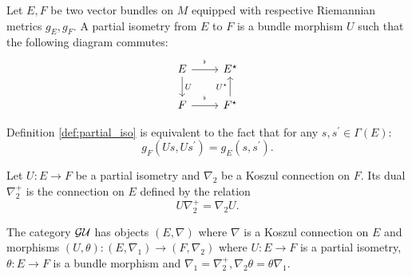\begin{defn}
\label{def:partial_iso}
Let $E,F$ be two vector bundles on $M$ equipped with respective Riemannian metrics $g_E,g_F.$ A partial isometry from $E$ to $F$ is a bundle morphism $U$ such that the following diagram commutes:
\begin{equation}
    \label{eq:partial_iso}
    \begin{tikzcd}
        E \ar[r,"{}^\flat"] \ar[d,"U"] & E^\star \\
        F \ar[r,"{}^\flat"] & F^\star \ar[u,"U^\star"]
    \end{tikzcd}
\end{equation}
\end{defn}
\begin{rem}
    Definition \ref{def:partial_iso} is equivalent to the fact that for any $s,s^\prime \in \Gamma(E)$:
    \[
    g_F\left(Us, Us^\prime\right) = g_E\left(s,s^\prime\right).
    \]
\end{rem}
\begin{defn}
\label{def:general_dual_connections}
Let $U \colon E \to F$ be a partial isometry and $\nabla_2$ be a Koszul connection on $F$. Its dual $\nabla_2^+$ is the connection on $E$ defined by the relation
\begin{equation}
    \label{eq:general_dual_connections}
    U \nabla_2^+ = \nabla_2 U.
\end{equation}
\end{defn}
\begin{defn}
    \label{def:category_gauge_dual}
    The category $\mathcal{GU}$ has objects $(E,\nabla)$ where $\nabla$ is a Koszul connection on $E$ and morphisms $(U, \theta) \colon (E, \nabla_1) \to (F, \nabla_2)$ where $U \colon E \to F$ is a partial isometry, $\theta \colon E \to F$ is a bundle morphism and $\nabla_1 = \nabla_2^+, \nabla_2 \theta = \theta \nabla_1.$
\end{defn}
